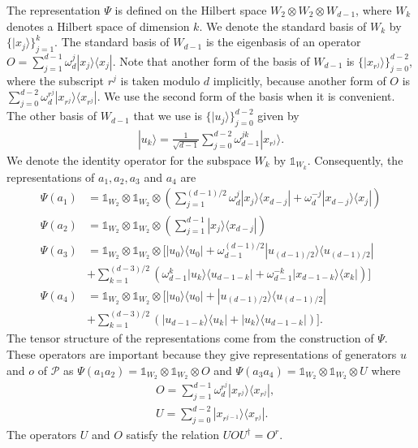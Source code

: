 \documentclass[11pt,letterpaper]{article}
\newcommand{\ket}[1]{|#1\rangle}
\newcommand{\ketbra}[2]{|#1\rangle\langle#2|}
\newcommand{\x}{\otimes}
\newcommand{\ct}{^{\dagger}}
\newcommand{\1}{\mathbb{1}}
\newcommand{\Pg}{\mathcal{P}}
\theoremstyle{definition}
\begin{document}
The representation $\Psi$ is defined on the Hilbert space
$W_2 \x W_2 \x W_{d-1}$,
where $W_k$ denotes a Hilbert space of
dimension $k$.  We denote the
standard basis of $W_k$
by $\{\ket{x_j}\}_{j=1}^{k}$.
The standard basis of $W_{d-1}$ is the eigenbasis of an operator $O = \sum_{j=1}^{d-1} \omega_d^j \ketbra{x_j}{x_j}$.
Note that another form of the basis of $W_{d-1}$ is $\{\ket{x_{r^j}}\}_{j=0}^{d-2}$, where the subscript $r^j$ is taken
modulo $d$ implicitly,
because another form of $O$ is $\sum_{j=0}^{d-2} \omega_d^{r^j} \ketbra{x_{r^j}}{x_{r^j}}$.
We use the second form of the basis when it is convenient.
The other basis of $W_{d-1}$ that we use is $\{ \ket{u_j} \}_{j=0}^{d-2}$ given by
\begin{align*}
	\ket{u_k} = \frac{1}{\sqrt{d-1}} \sum_{j=0}^{d-2} \omega_{d-1}^{jk} \ket{x_{r^j}}.
\end{align*}
We denote the identity operator for the subspace $W_k$ by $\1_{W_k}$.
Consequently, the representations of $a_1, a_2, a_3$ and $a_4$ are 
\begin{align*}
    \Psi(a_1) &= \1_{W_2} \x \1_{W_2} \x \left(\sum_{j=1}^{(d-1)/2} \omega_d^j \ketbra{x_j}{x_{d-j}} + \omega_d^{-j} \ketbra{x_{d-j}}{x_{j}}\right) \\
    \Psi(a_2) &= \1_{W_2} \x \1_{W_2} \x \left(\sum_{j=1}^{d-1} \ketbra{x_j}{x_{d-j}} \right)\\
    \Psi(a_3) &= \1_{W_2} \x \1_{W_2} \x \Big[\ketbra{u_0}{u_0} +\omega_{d-1}^{(d-1)/2}\ketbra{u_{(d-1)/2}}{u_{(d-1)/2}}\\ 
    &+ \sum_{k=1}^{(d-3)/2}\left( \omega_{d-1}^k\ketbra{u_k}{u_{d-1-k}} + \omega_{d-1}^{-k}\ketbra{x_{d-1-k}}{x_k}\right) \Big]\\
	\Psi(a_4) &= \1_{W_2} \x \1_{W_2} \x \Big[\ketbra{u_0}{u_0} +\ketbra{u_{(d-1)/2}}{u_{(d-1)/2}} \\
	& + \sum_{k=1}^{(d-3)/2}\left(\ketbra{u_{d-1-k}}{u_k} + \ketbra{u_k}{u_{d-1-k}}\right)\Big].
\end{align*}
The tensor structure of the representations come from the construction of $\Psi$.
These operators are important because they give representations of generators 
$u$ and $o$ of $\Pg$ as $\Psi(a_1a_2) = \1_{W_2} \x \1_{W_2} \x O$
and $\Psi(a_3a_4) = \1_{W_2} \x \1_{W_2} \x U$ where
\begin{align}
    &O = \sum_{j=1}^{d-1} \omega_d^{r^j} \ketbra{x_{r^j}}{x_{r^j}}, \\
    &U = \sum_{j=0}^{d-2} \ketbra{x_{r^{j-1}}}{x_{r^j}}.
\end{align}
The operators $U$ and $O$ satisfy the relation $UOU\ct = O^r$.
\end{document}
